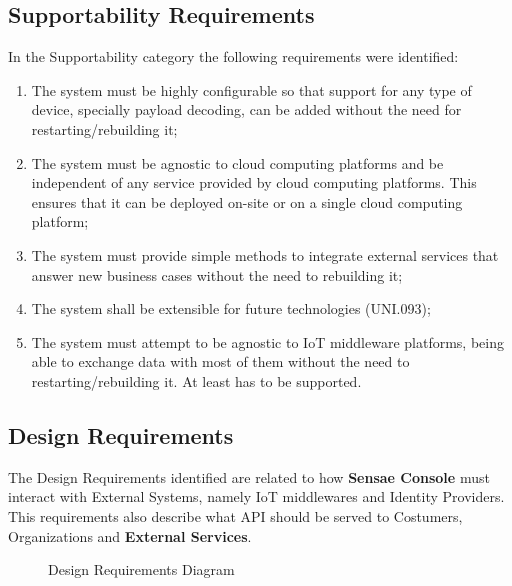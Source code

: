 \subsection{Supportability Requirements}
\label{subsec:requirements:non_functional:supportability}

In the Supportability category the following requirements were identified:

\begin{enumerate}
    \item The system must be highly configurable so that support for any type of device, specially payload decoding, can be added without the need for restarting/rebuilding it;
    \item The system must be agnostic to cloud computing platforms and be independent of any service provided by cloud computing platforms. This ensures that it can be deployed on-site or on a single cloud computing platform;
    \item The system must provide simple methods to integrate external services that answer new business cases without the need to rebuilding it;
    \item The system shall be extensible for future technologies (UNI.093);
    \item The system must attempt to be agnostic to \gls{IoT} middleware platforms, being able to exchange data with most of them without the need to restarting/rebuilding it. At least  has to be supported.
\end{enumerate}

\subsection{Design Requirements}
\label{subsec:requirements:non_functional:design}

The Design Requirements identified are related to how \textbf{Sensae Console} must interact with External Systems, namely \gls{IoT} middlewares and Identity Providers. This requirements also describe what \gls{API} should be served to Costumers, Organizations and \textbf{External Services}.

\begin{figure}[H]
    \centering
   \resizebox{0.5\columnwidth}{!}
   {
      
   }
   \caption[Design Requirements Diagram]{Design Requirements Diagram}
   \label{fig:requirements:non_functional:design}
\end{figure}

